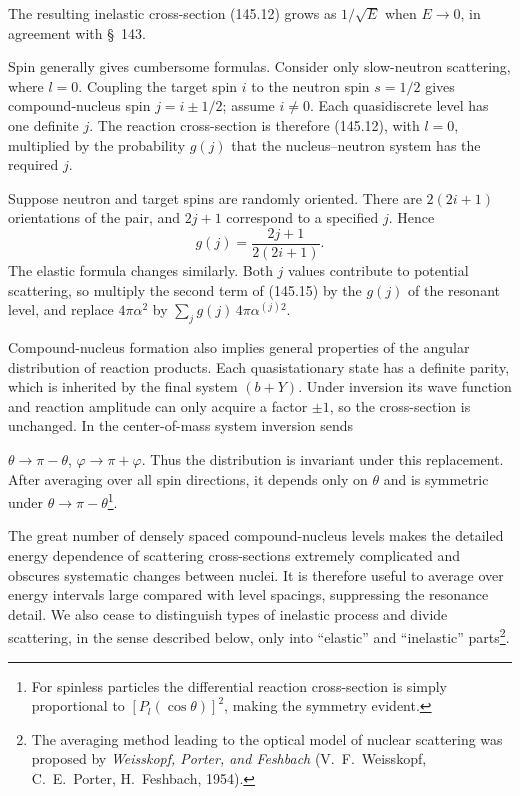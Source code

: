 The resulting inelastic cross-section (145.12) grows as $1/\sqrt E$ when
$E\to0$, in agreement with \S~143.

Spin generally gives cumbersome formulas. Consider only slow-neutron
scattering, where $l=0$. Coupling the target spin $i$ to the neutron spin
$s=1/2$ gives compound-nucleus spin $j=i\pm1/2$; assume $i\ne0$. Each
quasidiscrete level has one definite $j$. The reaction cross-section is
therefore (145.12), with $l=0$, multiplied by the probability $g(j)$ that the
nucleus--neutron system has the required $j$.

Suppose neutron and target spins are randomly oriented. There are
$2(2i+1)$ orientations of the pair, and $2j+1$ correspond to a specified
$j$. Hence
\begin{equation}
 g(j)=\frac{2j+1}{2(2i+1)}.
 \tag{145.18}
\end{equation}
The elastic formula changes similarly. Both $j$ values contribute to
potential scattering, so multiply the second term of (145.15) by the
$g(j)$ of the resonant level, and replace $4\pi\alpha^2$ by
$\sum_jg(j)\,4\pi\alpha^{(j)2}$.

Compound-nucleus formation also implies general properties of the angular
distribution of reaction products. Each quasistationary state has a definite
parity, which is inherited by the final system $(b+Y)$. Under inversion its
wave function and reaction amplitude can only acquire a factor $\pm1$, so
the cross-section is unchanged. In the center-of-mass system inversion sends

$\theta\to\pi-\theta$, $\varphi\to\pi+\varphi$. Thus the distribution is
invariant under this replacement. After averaging over all spin directions,
it depends only on $\theta$ and is symmetric under
$\theta\to\pi-\theta$\footnote{For spinless particles the differential
reaction cross-section is simply proportional to
$[P_l(\cos\theta)]^2$, making the symmetry evident.}.

The great number of densely spaced compound-nucleus levels makes the detailed
energy dependence of scattering cross-sections extremely complicated and
obscures systematic changes between nuclei. It is therefore useful to average
over energy intervals large compared with level spacings, suppressing the
resonance detail. We also cease to distinguish types of inelastic process and
divide scattering, in the sense described below, only into ``elastic'' and
``inelastic'' parts\footnote{The averaging method leading to the optical model
of nuclear scattering was proposed by \emph{Weisskopf, Porter, and Feshbach}
(V.~F.~Weisskopf, C.~E.~Porter, H.~Feshbach, 1954).}.

